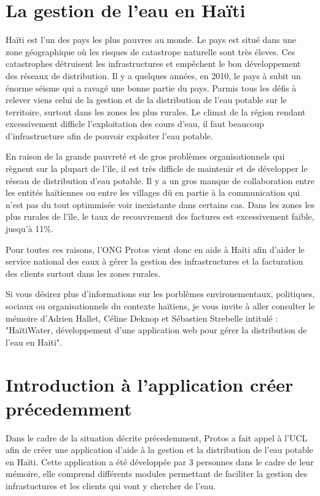 \documentclass{EPL-master-thesis-covers-FR}
\begin{document}
		\section{La gestion de l'eau en Haïti}
			\label{sec:situation}
			
				Haïti est l'un des pays les plus pauvres au monde. Le pays est situé dans une zone géographique où les risques de catastrope naturelle sont très éleves. Ces catastrophes détruisent les infrastructures et empêchent le bon développement des réseaux de distribution. Il y a quelques années, en 2010, le pays à subit un énorme séisme qui a ravagé une bonne partie du pays. Parmis tous les défis à relever viens celui de la gestion et de la distribution de l'eau potable sur le territoire, surtout dans les zones les plus rurales. Le climat de la région rendant excessivement difficle l'exploitation des cours d'eau, il faut beaucoup d'infrastructure afin de pouvoir exploiter l'eau potable.
				
				En raison de la grande pauvreté et de gros problèmes organisationnels qui règnent sur la plupart de l'île, il est très difficle de maintenir et de développer le réseau de distribution d'eau potable. Il y a un gros manque de collaboration entre les entités haïtiennes ou entre les villages dû en partie à la communication qui n'est pas du tout optimmisée voir inexistante dans certains cas. Dans les zones les plus rurales de l'île, le taux de recouvrement des factures est excessivement faible, jusqu'à 11\%.
				
				Pour toutes ces raisons, l'ONG Protos vient donc en aide à Haïti afin d'aider le service national des eaux à gérer la gestion des infrastructures et la facturation des clients surtout dans les zones rurales.
				
				Si vous désirez plus d'informations sur les porblèmes environementaux, politiques, sociaux ou organisationnels du contexte haïtiens, je vous invite à aller consulter le mémoire d'Adrien Hallet, Céline Deknop et Sébastien Strebelle intitulé :
				"HaïtiWater, développement d'une application web pour gérer la distribution de l'eau en Haïti".



		\section{Introduction à l'application créer précedemment}
				Dans le cadre de la situation décrite précedemment, Protos a fait appel à l'UCL afin de créer une application d'aide à la gestion et la distribution de l'eau potable en Haïti. Cette application a été développée par 3 personnes dans le cadre de leur mémoire, elle comprend différents modules permettant de faciliter la gestion des infrastuctures et les clients qui vont y chercher de l'eau.
				
\end{document}
